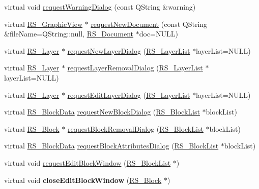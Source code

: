 \begin{DoxyCompactItemize}
\item 
virtual void \hyperlink{classQG__DialogFactory_a8b4d537e5d43184c28eab362e048702f}{request\-Warning\-Dialog} (const Q\-String \&warning)
\item 
virtual \hyperlink{classRS__GraphicView}{R\-S\-\_\-\-Graphic\-View} $\ast$ \hyperlink{classQG__DialogFactory_a61ef4d64473b7e2a493e3d4b3f5d9100}{request\-New\-Document} (const Q\-String \&file\-Name=Q\-String\-::null, \hyperlink{classRS__Document}{R\-S\-\_\-\-Document} $\ast$doc=N\-U\-L\-L)
\item 
virtual \hyperlink{classRS__Layer}{R\-S\-\_\-\-Layer} $\ast$ \hyperlink{classQG__DialogFactory_a11680139d112e8497805942896bc31f7}{request\-New\-Layer\-Dialog} (\hyperlink{classRS__LayerList}{R\-S\-\_\-\-Layer\-List} $\ast$layer\-List=N\-U\-L\-L)
\item 
virtual \hyperlink{classRS__Layer}{R\-S\-\_\-\-Layer} $\ast$ \hyperlink{classQG__DialogFactory_a75e710298b1640d41f39dc1ec9975c09}{request\-Layer\-Removal\-Dialog} (\hyperlink{classRS__LayerList}{R\-S\-\_\-\-Layer\-List} $\ast$layer\-List=N\-U\-L\-L)
\item 
virtual \hyperlink{classRS__Layer}{R\-S\-\_\-\-Layer} $\ast$ \hyperlink{classQG__DialogFactory_a790defe44d4869053a4485dd6059fa4f}{request\-Edit\-Layer\-Dialog} (\hyperlink{classRS__LayerList}{R\-S\-\_\-\-Layer\-List} $\ast$layer\-List=N\-U\-L\-L)
\item 
virtual \hyperlink{classRS__BlockData}{R\-S\-\_\-\-Block\-Data} \hyperlink{classQG__DialogFactory_a0f880d3a5e43fdb3ff333ca98974bc30}{request\-New\-Block\-Dialog} (\hyperlink{classRS__BlockList}{R\-S\-\_\-\-Block\-List} $\ast$block\-List)
\item 
virtual \hyperlink{classRS__Block}{R\-S\-\_\-\-Block} $\ast$ \hyperlink{classQG__DialogFactory_a0035330ffbe7b0b3dfa763494abfaed1}{request\-Block\-Removal\-Dialog} (\hyperlink{classRS__BlockList}{R\-S\-\_\-\-Block\-List} $\ast$block\-List)
\item 
virtual \hyperlink{classRS__BlockData}{R\-S\-\_\-\-Block\-Data} \hyperlink{classQG__DialogFactory_ad40e34b75eae32264a6822b5a4f21b0a}{request\-Block\-Attributes\-Dialog} (\hyperlink{classRS__BlockList}{R\-S\-\_\-\-Block\-List} $\ast$block\-List)
\item 
virtual void \hyperlink{classQG__DialogFactory_a083de978c17fbf8e802e6ae828fa9117}{request\-Edit\-Block\-Window} (\hyperlink{classRS__BlockList}{R\-S\-\_\-\-Block\-List} $\ast$)
\item 
\hypertarget{classQG__DialogFactory_aff301ce3ee9a3732850c568bf9f7966c}{virtual void {\bfseries close\-Edit\-Block\-Window} (\hyperlink{classRS__Block}{R\-S\-\_\-\-Block} $\ast$)}\label{classQG__DialogFactory_aff301ce3ee9a3732850c568bf9f7966c}


\end{DoxyCompactItemize}
